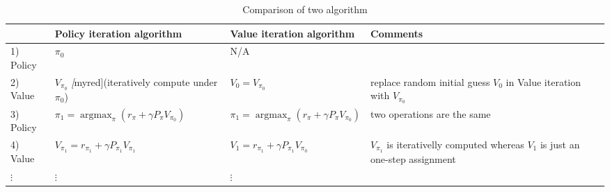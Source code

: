 \begin{table}
    \caption{Comparison of two algorithm}
    \begin{tabular}{m{4em}m{14em}m{14em}@{}m{14em}}
        \toprule
                & Policy iteration algorithm & Value iteration algorithm & Comments \\[6pt]
        \midrule
        1) Policy & $\pi_0$ & N/A & \\[6pt]
        2) Value  & $V_{\pi_0}$ \emph[myred]{(iteratively compute under $\pi_0$)} & $V_0=V_{\pi_0}$ & replace random initial guess $V_0$ in Value iteration with $V_{\pi_0}$ \\[6pt] 
        3) Policy & $\pi_1=\mathop{\arg \max}_\pi (r_\pi+\gamma P_\pi V_{\pi_0})$ & $\pi_1=\mathop{\arg \max}_\pi (r_\pi+\gamma P_\pi V_{\pi_0})$ & two operations are the same \\[6pt] 
        4) Value  & $V_{\pi_1}=r_{\pi_1}+\gamma P_{\pi_1}V_{\pi_1}$ & $ V_1=r_{\pi_1}+\gamma P_{\pi_1}V_{\pi_0}$ & $V_{\pi_1}$ is iterativelly computed whereas $V_1$ is just an one-step assignment\\ 
        $\vdots$  & $\vdots$ & $\vdots$ &   \\[6pt]
        \bottomrule
    \end{tabular}
\end{table}

